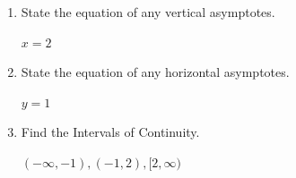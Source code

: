 \documentclass{ximera}
\begin{document}
\begin{problem}
\begin{enumerate}
		\item State the equation of any vertical asymptotes.
\begin{explanation}
			$x=2$
			\end{explanation}


		\item State the equation of any horizontal asymptotes.
\begin{explanation}
			$y=1$
			\end{explanation}
	
		\item Find the Intervals of Continuity.
\begin{explanation}
			$(-\infty,-1),(-1,2),[2,\infty)$
			\end{explanation}
	
	\end{enumerate}
\end{problem}
\end{document}
